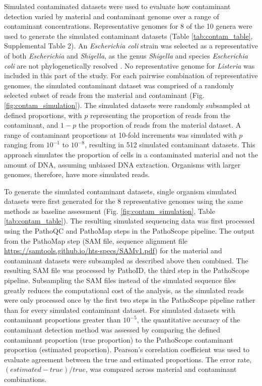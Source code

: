 \documentclass[fleqn,10pt,lineno]{wlpeerj}\usepackage[]{graphicx}\usepackage[]{color}
\begin{document}
Simulated contaminated datasets were used to evaluate how contaminant detection varied by material and contaminant genome over a range of contaminant concentrations.
Representative genomes for 8 of the 10 genera were used to generate the simulated contaminant datasets (Table \ref{tab:contam_table}, Supplemental Table 2).
An \textit{Escherichia coli} strain was selected as a representative of both \textit{Escherichia} and \textit{Shigella}, as the genus \textit{Shigella} and species \textit{Escherichia coli} are not phylogenetically resolved \citep{lan2002escherichia}. 
No representative genome for \textit{Listeria} was included in this part of the study. 
For each pairwise combination of representative genomes, the simulated contaminant dataset was comprised of a randomly selected subset of reads from the material and contaminant (Fig. \ref{fig:contam_simulation}).
The simulated datasets were randomly subsampled at defined proportions, with $p$ representing the proportion of reads from the contaminant, and $1-p$ the proportion of reads from the material dataset.
A range of contaminant proportions at 10-fold increments was simulated with $p$ ranging from $10^{-1}$ to $10^{-8}$, resulting in 512 simulated contaminant datasets.
This approach simulates the proportion of cells in a contaminated material and not the amount of DNA, assuming unbiased DNA extraction.
Organisms with larger genomes, therefore, have more simulated reads.


To generate the simulated contaminant datasets, single organism simulated datasets were first generated for the 8 representative genomes using the same methods as baseline assessment (Fig. \ref{fig:contam_simulation}, Table \ref{tab:contam_table}).
The resulting simulated sequencing data was first processed using the PathoQC and PathoMap steps in the PathoScope pipeline.
The output from the PathoMap step (SAM file, sequence alignment file \url{https://samtools.github.io/hts-specs/SAMv1.pdf}) for the material and contaminant datasets were subsampled as described above then combined.
The resulting SAM file was processed by PathoID, the third step in the PathoScope pipeline.
Subsampling the SAM files instead of the simulated sequence files greatly reduces the computational cost of the analysis, as the simulated reads were only processed once by the first two steps in the PathoScope pipeline rather than for every simulated contaminant dataset. 
For simulated datasets with contaminant proportions greater than $10^{-5}$, the quantitative accuracy of the contaminant detection method was assessed by comparing the defined contaminant proportion (true proportion) to the PathoScope contaminant proportion (estimated proportion). 
Pearson's correlation coefficient was used to evaluate agreement between the true and estimated proportions. 
The error rate, $(estimated-true)/true$, was compared across material and contaminant combinations.
\end{document}
